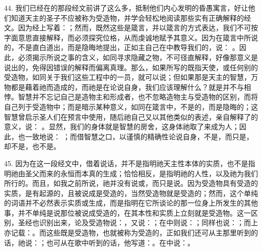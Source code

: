 44. 我们已经在的那段经文前讲了这么多，抵制他们内心发明的昏愚寓言，好让他们知道天主的圣子不应被称为受造物，并学会轻松地阅读那些实有正确解释的经文。因为经上写着：；然而，既然这些是箴言，并以箴言的方式表达，我们不可按字面意思直接解释，而必须探究位格，从而虔诚地赋予其意义。因为在箴言中所说的，不是直白道出，而是隐晦地提出，正如主自己在中教导我们的，说： 。因此，必须揭示所说之事的含义，如同寻求隐藏之物，不可径直解释，好像那意义是说出的，免得因错误的解释而偏离真理。那么，如果所写的既指天使，或任何别的受造物，如同关于我们这些工程中的一员，就可以说；但如果那是天主的智慧，万物都是藉着祂而造成的，而祂是在论说自身，我们应该理解什么？就是并不与相悖。智慧并不忘记自己是造物主和形成者，也不忽略造物主与受造物的区别，而将自己列于受造物中；而是暗示某种意义，如同在箴言中，不是的，而是隐晦的；这智慧曾启示圣人们在预言中使用，随后祂自己又以其他类似的表述，亲自解释了的意义，说： 。显然，我们的身体就是智慧的房舍，这身体祂取了来成为人；因此，也一致地说： ；而借智慧之口，以谨慎的精确性论说自身，不是，而只是，却不是，也不是。\par

45. 因为在这一段经文中，借着说话，并不是指明祂天主性本体的实质，也不是指明祂由圣父而来的永恒而本真的生成；恰恰相反，是指明祂的人性，以及祂为我们所行的。而且，如我之前所说，祂并没有说或，而只是说。因为受造物具有受造的实质，是有起源的，且被说成是受造的，当然受造物就是受造的；然而，这个单纯的词语并不必然表示实质或生成，而是指明在它所谈论的那一位身上所发生的其他事，并不单纯是说那位被说成受造的，在其本性和实质上立刻就是受造物。这一区别，圣经也识别出来，论及受造物说：，又说：；在中则说：；同样也说：；而上亦记载：。而这些既是受造物，也就被称为受造的，正如我们还可从主那里听到的话，祂说：；也可从在歌中听到的话，他写道：。在中说：。\par

